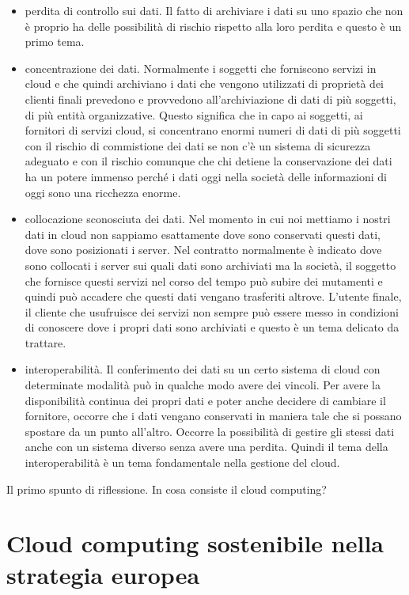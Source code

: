 \begin{itemize}
    \item perdita di controllo sui dati. Il fatto di archiviare i dati su uno spazio che non è proprio ha delle possibilità di rischio rispetto alla loro perdita e questo è un primo tema.
    \item  concentrazione dei dati. Normalmente i soggetti che forniscono servizi in cloud e che quindi archiviano i dati che vengono utilizzati di proprietà dei clienti finali prevedono e provvedono all'archiviazione di dati di più soggetti, di più entità organizzative. Questo significa che in capo ai soggetti, ai fornitori di servizi cloud, si concentrano enormi numeri di dati di più soggetti con il rischio di commistione dei dati se non c'è un sistema di sicurezza adeguato e con il rischio comunque che chi detiene la conservazione dei dati ha un potere immenso perché i dati oggi nella società delle informazioni di oggi sono una ricchezza enorme.
    \item collocazione sconosciuta dei dati. Nel momento in cui noi mettiamo i nostri dati in cloud non sappiamo esattamente dove sono conservati questi dati, dove sono posizionati i server. Nel contratto normalmente è indicato dove sono collocati i server sui quali dati sono archiviati ma la società, il soggetto che fornisce questi servizi nel corso del tempo può subire dei mutamenti e quindi può accadere che questi dati vengano trasferiti altrove. L'utente finale, il cliente che usufruisce dei servizi non sempre può essere messo in condizioni di conoscere dove i propri dati sono archiviati e questo è un tema delicato da trattare. 
    \item  interoperabilità. Il conferimento dei dati su un certo sistema di cloud con determinate modalità può in qualche modo avere dei vincoli. Per avere la disponibilità continua dei propri dati e poter anche decidere di cambiare il fornitore, occorre che i dati vengano conservati in maniera tale che si possano spostare da un punto all'altro. Occorre la possibilità di gestire gli stessi dati anche con un sistema diverso senza avere una perdita. Quindi il tema della interoperabilità è un tema fondamentale nella gestione del cloud.
\end{itemize}

Il primo spunto di riflessione. In cosa consiste il cloud computing? 

\section{Cloud computing sostenibile nella strategia europea}

